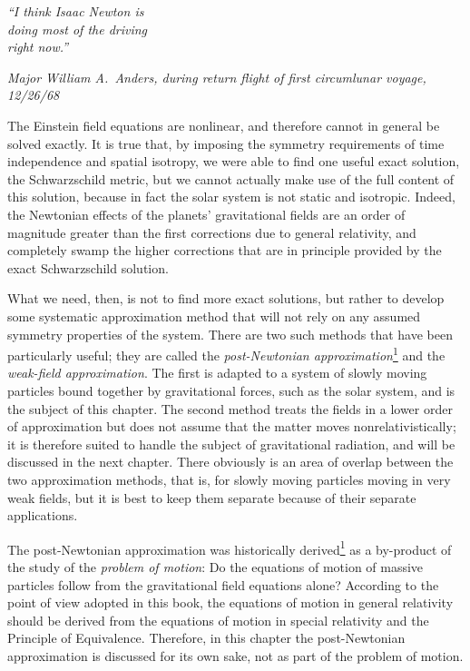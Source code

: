 
\begin{flushleft}
\begin{minipage}{0.36\textwidth}
\itshape
``I think Isaac Newton is\\
doing most of the driving\\
right now.''

\medskip
\upshape
\textit{Major William A.~Anders, during return flight of first circumlunar
voyage, 12/26/68}
\end{minipage}
\end{flushleft}

The Einstein field equations are nonlinear, and therefore cannot in general
be solved exactly. It is true that, by imposing the symmetry requirements of
time independence and spatial isotropy, we were able to find one useful exact
solution, the Schwarzschild metric, but we cannot actually make use of the
full content of this solution, because in fact the solar system is not static
and isotropic. Indeed, the Newtonian effects of the planets' gravitational
fields are an order of magnitude greater than the first corrections due to
general relativity, and completely swamp the higher corrections that are in
principle provided by the exact Schwarzschild solution.

What we need, then, is not to find more exact solutions, but rather to develop
some systematic approximation method that will not rely on any assumed
symmetry properties of the system. There are two such methods that have been
particularly useful; they are called the \emph{post-Newtonian
approximation}\hyperref[ch9-ref-1]{\textsuperscript{1}} and the
\emph{weak-field approximation}. The first is adapted to a system of slowly
moving particles bound together by gravitational forces, such as the solar
system, and is the subject of this chapter. The second method treats the
fields in a lower order of approximation but does not assume that the matter
moves nonrelativistically; it is therefore suited to handle the subject of
gravitational radiation, and will be discussed in the next chapter. There
obviously is an area of overlap between the two approximation methods, that
is, for slowly moving particles moving in very weak fields, but it is best to
keep them separate because of their separate applications.

The post-Newtonian approximation was historically
derived\hyperref[ch9-ref-1]{\textsuperscript{1}} as a by-product of the study
of the \emph{problem of motion}: Do the equations of motion of massive
particles follow from the gravitational field equations
alone? According to the point of view
adopted in this book, the equations of motion in general relativity should be
derived from the equations of motion in special relativity and the Principle
of Equivalence. Therefore, in this chapter the post-Newtonian approximation
is discussed for its own sake, not as part of the problem of motion.
